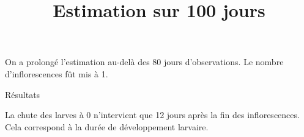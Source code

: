 \documentclass[a4paper, 11pt]{article}
\title{Estimation sur 100 jours}
\author{}
\date{}
\begin{document}
 \maketitle
 
On a prolongé l'estimation au-delà des 80 jours d'observations. Le nombre d'inflorescences fût mis à 1.

Résultats
\begin{figure}[ht]
\centering
\end{figure}

La chute des larves à 0 n'intervient que 12 jours après la fin des inflorescences. Cela correspond à la durée de développement larvaire.
\end{document}
